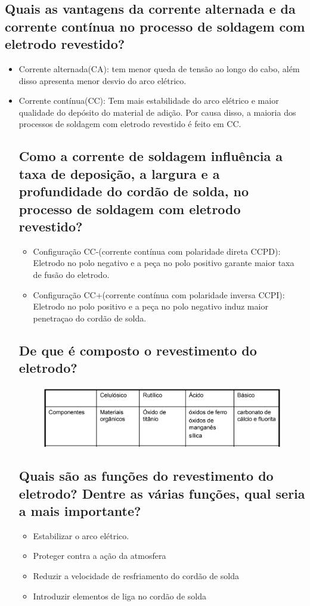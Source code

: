 \documentclass[a4paper, 12pt]{article}
\begin{document}
	\subsection{Quais as vantagens da corrente alternada e da corrente contínua no processo de soldagem
com eletrodo revestido?}
	\begin{itemize}
		\item Corrente alternada(CA): tem menor queda de tensão ao longo do cabo, além disso apresenta menor desvio do arco elétrico.
		\item Corrente contínua(CC): Tem mais estabilidade do arco elétrico e maior qualidade do depósito do material de adição. Por causa disso, a maioria dos processos de soldagem com eletrodo revestido é feito em CC.
	
	\subsection{Como a corrente de soldagem influência a taxa de deposição, a largura e a profundidade
do cordão de solda, no processo de soldagem com eletrodo revestido?}
		\begin{itemize}
			\item Configuração CC-(corrente contínua com polaridade direta CCPD): Eletrodo no polo negativo e a peça no polo positivo garante maior taxa de fusão do eletrodo.
			\item Configuração CC+(corrente contínua com polaridade inversa CCPI): Eletrodo no polo positivo e a peça no polo negativo induz maior penetraçao do cordão de solda.
		\end{itemize}
		
	\subsection{De que é composto o revestimento do eletrodo?}
		\begin{figure}[h]
			\includegraphics[scale=.5]{a.png}
		\end{figure}
		
	\subsection{Quais são as funções do revestimento do eletrodo? Dentre as várias funções, qual seria a
mais importante?}
		\begin{itemize}
			\item Estabilizar o arco elétrico.
			\item Proteger contra a ação da atmosfera
			\item Reduzir a velocidade de resfriamento do cordão de solda 
			\item Introduzir elementos de liga no cordão de solda
			

\end{itemize}
\end{itemize}
\end{document}
